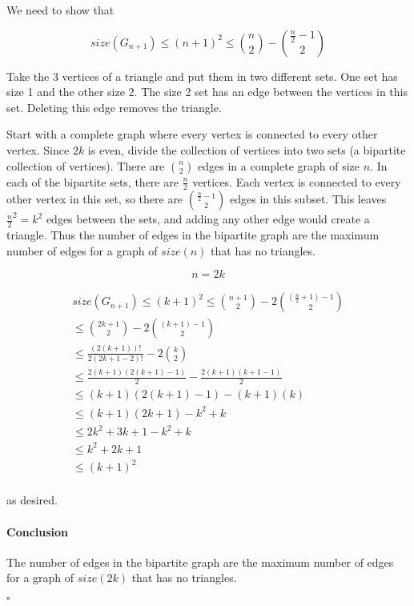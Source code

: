 \documentclass[11pt]{article}
\begin{document}
We need to show that

$$size(G_{n+1}) \le (n+1)^2 \le {n \choose 2} - {\frac{n}{2} - 1 \choose 2}$$

Take the 3 vertices of a triangle and put them in two different sets.
One set has size 1 and the other size 2.
The size 2 set has an edge between the vertices in this set.
Deleting this edge removes the triangle.

Start with a complete graph where every vertex is connected to every other vertex.
Since $2k$ is even, divide the collection of vertices into two sets (a bipartite collection of vertices).
There are ${n \choose 2}$ edges in a complete graph of size $n$.
In each of the bipartite sets, there are $\frac{n}{2}$ vertices.
Each vertex is connected to every other vertex in this set, so there are ${\frac{n}{2} - 1 \choose 2}$ edges in this subset.
This leaves $\frac{n}{2}^2=k^2$ edges between the sets, and adding any other edge would create a triangle.
Thus the number of edges in the bipartite graph are the maximum number of edges for a graph of $size(n)$ that has no triangles.

$$n = 2k$$

$$
\begin{aligned}
	size(G_{n+1}) \le (k + 1)^2 \le {n + 1 \choose 2} - 2{(\frac{n}{2} + 1) - 1 \choose 2} \\
	\le {2k + 1 \choose 2} - 2{(k + 1) - 1 \choose 2} \\
	\le \frac{(2(k + 1))!}{2(2k + 1 - 2)!} - 2{k \choose 2} \\
	\le \frac{2(k+1)(2(k+1) - 1)}{2} - \frac{2(k+1)(k+1-1)}{2} \\
	\le (k+1)(2(k+1) - 1) - (k+1)(k) \\
	\le (k+1)(2k+1) - k^2 +k \\
	\le 2k^2+3k+1 - k^2 +k \\
	\le k^2 + 2k + 1 \\
	\le (k+1)^2 \\
\end{aligned}
$$

as desired.

\paragraph{Conclusion}

The number of edges in the bipartite graph are the maximum number of edges for a graph of $size(2k)$ that has no triangles.

$\square$
\end{document}
